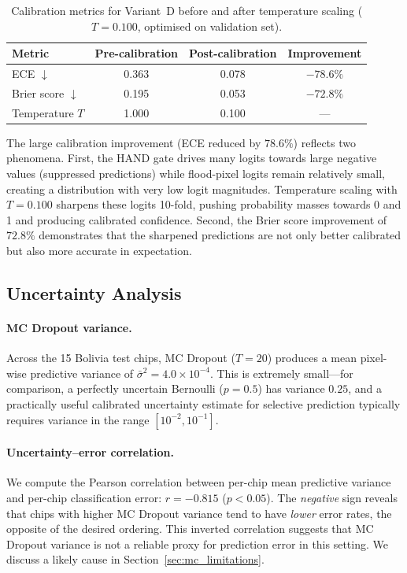 \documentclass[12pt]{article}
\begin{document}
\begin{table}[h]
\centering
\caption{Calibration metrics for Variant~D before and after temperature
scaling ($T = 0.100$, optimised on validation set).}
\label{tab:calibration}
\begin{tabular}{lccc}
\toprule
\textbf{Metric} & \textbf{Pre-calibration} & \textbf{Post-calibration}
  & \textbf{Improvement} \\
\midrule
ECE $\downarrow$   & 0.363 & 0.078 & $-78.6\%$ \\
Brier score $\downarrow$ & 0.195 & 0.053 & $-72.8\%$ \\
Temperature $T$    & 1.000 & 0.100 & — \\
\bottomrule
\end{tabular}
\end{table}

The large calibration improvement (ECE reduced by $78.6\%$) reflects two
phenomena.  First, the HAND gate drives many logits towards large negative
values (suppressed predictions) while flood-pixel logits remain relatively
small, creating a distribution with very low logit magnitudes.  Temperature
scaling with $T=0.100$ sharpens these logits 10-fold, pushing probability
masses towards 0 and 1 and producing calibrated confidence.  Second, the
Brier score improvement of $72.8\%$ demonstrates that the sharpened
predictions are not only better calibrated but also more accurate in
expectation.

\subsection{Uncertainty Analysis}
\label{sec:uncertainty_results}

\paragraph{MC Dropout variance.}
Across the 15 Bolivia test chips, MC Dropout ($T=20$) produces a mean
pixel-wise predictive variance of $\bar{\sigma}^2 = 4.0 \times 10^{-4}$.
This is extremely small—for comparison, a perfectly uncertain Bernoulli
($p=0.5$) has variance $0.25$, and a practically useful calibrated
uncertainty estimate for selective prediction typically requires variance
in the range $[10^{-2}, 10^{-1}]$.

\paragraph{Uncertainty–error correlation.}
We compute the Pearson correlation between per-chip mean predictive variance
and per-chip classification error: $r = -0.815$ ($p < 0.05$).  The
\emph{negative} sign reveals that chips with higher MC Dropout variance tend
to have \emph{lower} error rates, the opposite of the desired ordering.  This
inverted correlation suggests that MC Dropout variance is not a reliable proxy
for prediction error in this setting.  We discuss a likely cause in
Section~\ref{sec:mc_limitations}.
\end{document}
